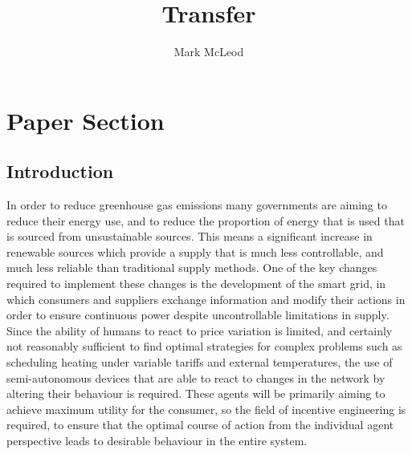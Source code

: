 \documentclass[a4paper, 10 pt, conference]{ieeeconf}  %
\title{\LARGE \bf Transfer}
\author{Mark McLeod}
\date{}
\begin{document}
\maketitle
\thispagestyle{empty}
\pagestyle{empty}

\section{Paper Section}
\subsection{Introduction}

In order to reduce greenhouse gas emissions many governments are aiming to reduce their energy use, and to reduce the proportion of energy that is used that is sourced from unsustainable sources. This means a significant increase in renewable sources which provide a supply that is much less controllable, and much less reliable than traditional supply methods. One of the key changes required to implement these changes is the development of the smart grid, in which consumers and suppliers exchange information and modify their actions in order to ensure continuous power despite uncontrollable limitations in supply. Since the ability of humans to react to price variation is limited, and certainly not reasonably sufficient to find optimal strategies for complex problems such as scheduling heating under variable tariffs and external temperatures, the use of semi-autonomous devices that are able to react to changes in the network by altering their behaviour is required. These agents will be primarily aiming to achieve maximum utility for the consumer, so the field of incentive engineering is required, to ensure that the optimal course of action from the individual agent perspective leads to desirable behaviour in the entire system.
\end{document}
